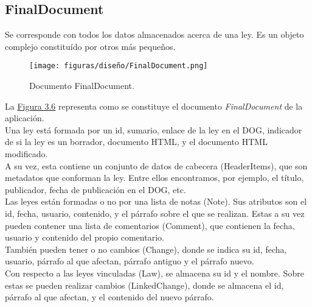 \subsection{FinalDocument}

Se corresponde con todos los datos almacenados acerca de una ley. Es un objeto complejo constituído por otros más pequeños.

\begin{figure}[H]
\centerline{\texttt{[image: figuras/diseño/FinalDocument.png]}}
\caption{Documento FinalDocument.}
\label{enlaceFinalDocument}
\end{figure}

La \hyperref[enlaceFinalDocument]{Figura 3.6} representa como se constituye el documento {\it FinalDocument} de la aplicación.
\\

Una ley está formada por un id, sumario, enlace de la ley en el DOG, indicador de si la ley es un borrador, documento HTML, y el documento HTML modificado. 
\\

A su vez, esta contiene un conjunto de datos de cabecera (HeaderItems), que son metadatos que conforman la ley. Entre ellos encontramos, por ejemplo, el título, publicador, fecha de publicación en el DOG, etc.
\\

Las leyes están formadas o no por una lista de notas (Note). Sus atributos son el id, fecha, usuario, contenido, y el párrafo sobre el que se realizan. Estas a su vez pueden contener una lista de comentarios (Comment), que contienen la fecha, usuario y contenido del propio comentario.
\\

También pueden tener o no cambios (Change), donde se indica su id, fecha, usuario, párrafo al que afectan, párrafo antiguo y el párrafo nuevo.
\\

Con respecto a las leyes vinculadas (Law), se almacena su id y el nombre. Sobre estas se pueden realizar cambios (LinkedChange), donde se almacena el id, párrafo al que afectan, y el contenido del nuevo párrafo.